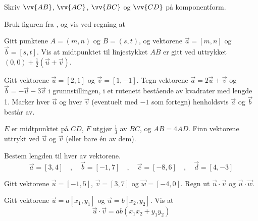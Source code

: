 



	
\opgt

Skriv $\vv{AB}$, $\vv{AC}$, $\vv{BC}$ og $\vv{CD}$ på komponentform.


\nes
{}
Bruk figuren fra , og vis ved regning at \os
{}

Gitt punktene $ A=(m, n) $ og $ B=(s, t) $, og vektorene $ \vec{a}=[m, n] $ og $ \vec{b}=[s, t] $. Vis at midtpunktet til linjestykket $ AB $ er gitt ved uttrykket $(0, 0) + \frac{1}{2}(\vec{u}+\vec{v})$.

Gitt vektorene $\vec{u}=[2, 1]$ og $\vec{v}=[1, -1]$. Tegn vektorene $\vec{a}=2\vec{u}+\vec{v}$ og $\vec{b}=-\vec{u}-3\vec{v}$ i grunnstillingen, i et rutenett bestående av kvadrater med lengde 1. Marker hver $\vec{u}$ og hver $\vec{v}$ (eventuelt med $-1$ som fortegn) henholdsvis $\vec{a}$ og $\vec{b}$ består av.

\newpage
{}
$E$ er midtpunktet på $CD$, $F$ utgjør $\frac{1}{3}$ av $BC$, og $AB=4AD$.
Finn vektorene uttrykt ved $\vec{u}$ og $\vec{v}$ (eller bare én av dem). \os
{}

\nes

Bestem lengden til hver av vektorene.
\[ \vec{a} = [3, 4]\quad,\quad
\vec{b} = [-1, 7]\quad,\quad
\vec{c} = [-8, 6]\quad,\quad
\vec{d} = [4, -3] \]

\nes

Gitt vektorene $\vec{u}=[-1, 5]$, $\vec{v}=[3, 7]$ og $\vec{w}=[-4, 0]$.
Regn ut $\vec{u}\cdot\vec{v}$ og $\vec{u}\cdot\vec{w}$.

Gitt vektorene $\vec{u}=a[x_1, y_1]$ og $\vec{u}=b[x_2, y_2]$. Vis at
\[ \vec{u}\cdot\vec{v}=ab (x_1x_2+y_1y_2) \]



 \vs
{}

